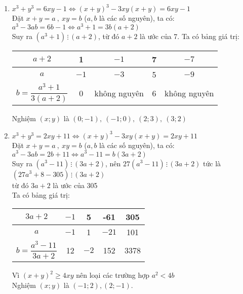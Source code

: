 \begin{bt}
{\begin{enumerate}
            \item $x^3+y^3=6xy-1 \Leftrightarrow (x+y)^3-3xy(x+y)=6xy-1$\\
            Đặt $x+y=a\ ,\ xy=b$ ($a,b$ là các số nguyên), ta có:\\
            $a^3-3ab=6b-1 \Leftrightarrow a^3+1=3b(a+2)$\\
            Suy ra $(a^3+1)\, \vdots \,(a+2)$, từ đó $a+2$ là ước của 7. Ta có bảng giá trị:
            \begin{center}
                \begin{tabular}{|c|c|c|c|c|}
                    \hline
                    $a+2$ & 1 & $-1$ & 7 & $-7$ \\
                    \hline
                    $a$ & $-1$ & $-3$ &  5 & $-9$ \\
                    \hline 
                    $b=\dfrac{a^3+1}{3(a+2)}$ & 0 & không nguyên & 6 & không nguyên\\
                    \hline
\end{tabular}
\end{center}
            Nghiệm $(x;y)$ là $(0;-1),\ (-1;0),\ (2;3),\ (3;2)$
            \item $x^3+y^3=2xy+11 \Leftrightarrow (x+y)^3-3xy(x+y)=2xy+11$\\
            Đặt $x+y=a\ ,\ xy=b$ ($a,b$ là các số nguyên), ta có:\\
            $a^3-3ab=2b+11 \Leftrightarrow a^3-11=b(3a+2)$\\
            Suy ra $(a^3-11)\, \vdots \, (3a+2)$, nên $27(a^3-11)\, \vdots \,(3a+2)$ tức là $(27a^3+8-305)\, \vdots \,(3a+2)$\\
            từ đó $3a+2$ là ước của 305\\
            Ta có bảng giá trị:
            \begin{center}
                \begin{tabular}{|c|c|c|c|c|}
                    \hline
                    $3a+2$ & $-1$ & 5 & -61 & 305 \\
                    \hline
                    $a$ & $-1$ & 1 &  $-21$ & 101 \\
                    \hline 
                    $b=\dfrac{a^3-11}{3a+2}$ & 12 & $-2$ & 152 & 3378\\
                    \hline
\end{tabular}
\end{center}
        Vì $(x+y)^2\geq 4xy$ nên loại các trường hợp $a^2<4b$\\
        Nghiệm $(x;y)$ là $(-1;2),  (2;-1)$.
\end{enumerate}
}
\end{bt}

